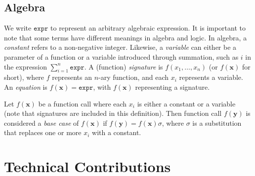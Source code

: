 \documentclass[a4paper,UKenglish,cleveref, autoref, thm-restate]{lipics-v2021}
\newcommand{\expr}{\mathtt{expr}}
\begin{document}
\subsection{Algebra}\label{sec:algebra}


We write $\expr{}$ to represent an arbitrary algebraic expression. It is
important to note that some terms have different meanings in algebra and
logic. In algebra, a \emph{constant} refers to a non-negative integer. Likewise,
a \emph{variable} can either be a parameter of a function or a variable
introduced through summation, such as $i$ in the expression
$\sum_{i=1}^{n} \expr$. A (function) \emph{signature} is
$f(x_{1}, \dots, x_{n})$ (or $f(\mathbf{x})$ for short), where $f$ represents an
$n$-ary function, and each $x_{i}$ represents a variable. An \emph{equation} is
$f(\mathbf{x}) = \expr{}$, with $f(\mathbf{x})$ representing a signature.

\begin{definition}\label{def:basecase}
  Let $f(\mathbf{x})$ be a function call where each $x_{i}$ is either a constant
  or a variable (note that signatures are included in this definition). Then
  function call $f(\mathbf{y})$ is considered a \emph{base case} of
  $f(\mathbf{x})$ if $f(\mathbf{y}) = f(\mathbf{x})\sigma$, where $\sigma$ is a
  substitution that replaces one or more $x_{i}$ with a constant.
\end{definition}

\section{Technical Contributions}\label{sec:main}





\end{document}
